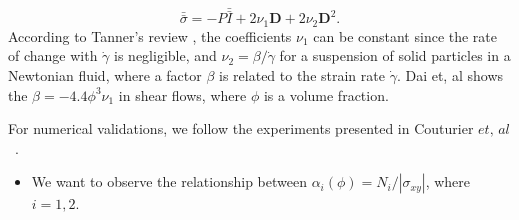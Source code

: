 \begin{equation}
  \bar{\bar{\sigma}} = -P \bar{\bar{I}}
  + 2 \nu_1 {\bm{D}} + 2 \nu_2 {\bm{D}}^2.
\end{equation}
According to Tanner's review \cite{tanner_review_2018}, the coefficients $\nu_1$ can be constant since the rate of change with $\dot{\gamma}$ is negligible, and $\nu_2 = \beta / \dot{\gamma}$ for a suspension of solid particles in a Newtonian fluid, where a factor $\beta$ is related to the strain rate $\dot{\gamma}$. Dai et, al \cite{dai_viscometric_2013} shows the $\beta = -4.4 \phi^3 \nu_1$ in shear flows, where $\phi$ is a volume fraction. 
\par
For numerical validations, we follow the experiments presented in Couturier $\textit{et, al}$~\cite{couturier_suspensions_2011}.
\begin{itemize}
  \item We want to observe the relationship between $\alpha_i(\phi) = N_i / |\sigma_{xy}|$, where $i = 1,2$.
\end{itemize}
